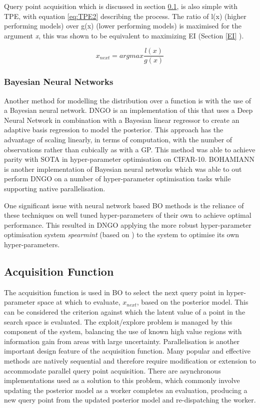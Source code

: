\documentclass{article}
\begin{document}
			Query point acquisition which is discussed in section \ref{AF}, is also simple with TPE, with equation \ref{eq:TPE2} describing the process. The ratio of l(x) (higher performing models) over g(x) (lower performing models) is maximised for the argument \textit{x}, this was shown to be equivalent to maximizing EI \cite{20} (Section \ref{EI} ).

			\begin{equation}\label{eq:TPE2} x_{next} = argmax \frac{l(x)}{g(x)}\end{equation}


		\subsubsection{Bayesian Neural Networks}

			Another method for modelling the distribution over a function is with the use of a Bayesian neural network. DNGO \cite{22} is an implementation of this that uses a Deep Neural Network in combination with a Bayesian linear regressor to create an adaptive basis regression to model the posterior. This approach has the advantage of scaling linearly, in terms of computation, with the number of observations rather than cubically as with a GP. This method was able to achieve parity with SOTA in hyper-parameter optimisation on CIFAR-10. BOHAMIANN \cite{40} is another implementation of Bayesian neural networks which was able to out perform DNGO on a number of hyper-parameter optimisation tasks while supporting native parallelisation. 
			\par
			One significant issue with neural network based BO methods is the reliance of these techniques on well tuned hyper-parameters of their own to achieve optimal performance. This resulted in DNGO applying the more robust hyper-parameter optimisation system \textit{spearmint} (based on \cite{20}) to the system to optimise its own hyper-parameters.




	\subsection {Acquisition Function} \label{AF}

		The acquisition function is used in BO to select the next query point in hyper-parameter space at which to evaluate, \(x_{next}\), based on the posterior model. This can be considered the criterion against which the latent value of a point in the search space is evaluated. The exploit/explore problem is managed by this component of the system, balancing the use of known high value regions with information gain from areas with large uncertainty. Parallelisation is another important design feature of the acquisition function. Many popular and effective methods are natively sequential and therefore require modification or extension to accommodate parallel query point acquisition. There are asynchronous implementations used as a solution to this problem, which commonly involve updating the posterior model as a worker completes an evaluation, producing a new query point from the updated posterior model and re-dispatching the worker. \cite{26}\cite{27}\cite{20}
\end{document}
